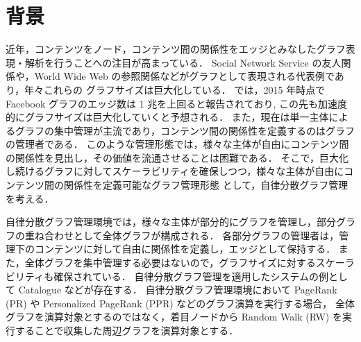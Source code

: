 \section{背景}
近年，コンテンツをノード，コンテンツ間の関係性をエッジとみなしたグラフ表現・解析を行うことへの注目が高まっている．
Social Network Service の友人関係や，World Wide Web の参照関係などがグラフとして表現される代表例であり，年々これらの
グラフサイズは巨大化している．
\cite{ching2015one}では，2015 年時点で Facebook グラフのエッジ数は 1 兆を上回ると報告されており, 
この先も加速度的にグラフサイズは巨大化していくと予想される．
また，現在は単一主体によるグラフの集中管理が主流であり，コンテンツ間の関係性を定義するのはグラフの管理者である．
このような管理形態では，様々な主体が自由にコンテンツ間の関係性を見出し，その価値を流通させることは困難である．
そこで，巨大化し続けるグラフに対してスケーラビリティを確保しつつ，様々な主体が自由にコンテンツ間の関係性を定義可能なグラフ管理形態
として，自律分散グラフ管理を考える．

自律分散グラフ管理環境では，様々な主体が部分的にグラフを管理し，部分グラフの重ね合わせとして全体グラフが構成される．
各部分グラフの管理者は，管理下のコンテンツに対して自由に関係性を定義し，エッジとして保持する．
また，全体グラフを集中管理する必要はないので，グラフサイズに対するスケーラビリティも確保されている．
自律分散グラフ管理を適用したシステムの例として Catalogue \cite{catalogue}などが存在する．
自律分散グラフ管理環境において PageRank (PR) \cite{page1999pagerank} や Personalized PageRank (PPR) \cite{page1999pagerank} などのグラフ演算を実行する場合，
全体グラフを演算対象とするのではなく，着目ノードから Random Walk (RW) を実行することで収集した周辺グラフを演算対象とする． 

